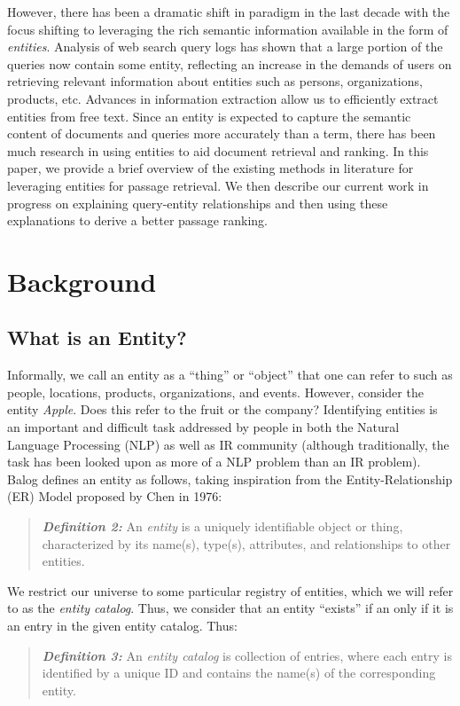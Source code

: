\documentclass{article}
\begin{document}
However, there has been a dramatic shift in paradigm in the last decade with the focus shifting to leveraging the rich semantic information available in the form of \textit{entities}. Analysis of web search query logs has shown that a large portion of the queries now contain some entity, reflecting an increase in the demands of users on retrieving relevant information about entities such as persons, organizations, products, etc. Advances in information extraction allow us to efficiently extract entities from free text. Since an entity is expected to capture the semantic content of documents and queries more accurately than a term, there has been much research in using entities to aid document retrieval and ranking. In this paper, we provide a brief overview of the existing methods in literature for leveraging entities for passage retrieval. We then describe our current work in progress on explaining query-entity relationships and then using these explanations to derive a better passage ranking. 

\section{Background}
\label{sec:background}
\subsection{What is an Entity?}
\label{subsec:what-is-an-entity}

Informally, we call an entity as a ``thing'' or ``object'' that one can refer to such as people, locations, products, organizations, and events. However, consider the entity \textit{Apple}. Does this refer to the fruit or the company? Identifying entities is an important and difficult task addressed by people in both the Natural Language Processing (NLP) as well as IR community (although traditionally, the task has been looked upon as more of a NLP problem than an IR problem). Balog \cite{balog2018entity} defines an entity as follows, taking inspiration from the Entity-Relationship (ER) Model proposed by Chen \cite{Chen:1976:EMU:320434.320440} in 1976:
\begin{quote}
    \textit{\textbf{Definition 2:}} An \textit{entity} is a uniquely identifiable object or thing, characterized by its name(s), type(s), attributes, and relationships to other entities.
\end{quote}
We restrict our universe to some particular registry of entities, which we will refer to as the \textit{entity catalog}. Thus, we consider that an entity ``exists'' if an only if it is an entry in the given entity catalog. Thus:
\begin{quote}
    \textit{\textbf{Definition 3:}} An \textit{entity catalog} is collection of entries, where each entry is identified by a unique ID and contains the name(s) of the corresponding entity.
\end{quote}
\end{document}
